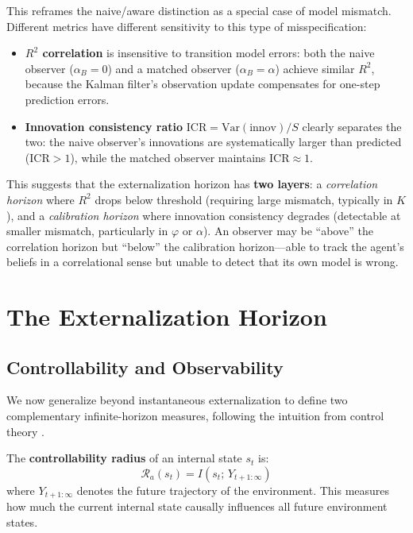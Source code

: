 \documentclass[runningheads]{llncs}
\begin{document}
This reframes the naive/aware distinction as a special case of model mismatch. Different metrics have different sensitivity to this type of misspecification:
\begin{itemize}
    \item \textbf{$R^2$ correlation} is insensitive to transition model errors: both the naive observer ($\alpha_B = 0$) and a matched observer ($\alpha_B = \alpha$) achieve similar $R^2$, because the Kalman filter's observation update compensates for one-step prediction errors.
    \item \textbf{Innovation consistency ratio} $\mathrm{ICR} = \mathrm{Var}(\text{innov})/S$ clearly separates the two: the naive observer's innovations are systematically larger than predicted ($\mathrm{ICR} > 1$), while the matched observer maintains $\mathrm{ICR} \approx 1$.
\end{itemize}

This suggests that the externalization horizon has \textbf{two layers}: a \emph{correlation horizon} where $R^2$ drops below threshold (requiring large mismatch, typically in $K$), and a \emph{calibration horizon} where innovation consistency degrades (detectable at smaller mismatch, particularly in $\varphi$ or $\alpha$). An observer may be ``above'' the correlation horizon but ``below'' the calibration horizon---able to track the agent's beliefs in a correlational sense but unable to detect that its own model is wrong.

\section{The Externalization Horizon}
\label{sec:horizon}

\subsection{Controllability and Observability}

We now generalize beyond instantaneous externalization to define two complementary infinite-horizon measures, following the intuition from control theory \cite{baltieri2020bayesian}.

\begin{definition}[Controllability]
The \textbf{controllability radius} of an internal state $s_t$ is:
\begin{equation}
    \mathcal{R}_a(s_t) = I(s_t; \, Y_{t+1:\infty})
    \label{eq:controllability}
\end{equation}
where $Y_{t+1:\infty}$ denotes the future trajectory of the environment. This measures how much the current internal state causally influences all future environment states.
\end{definition}
\end{document}
